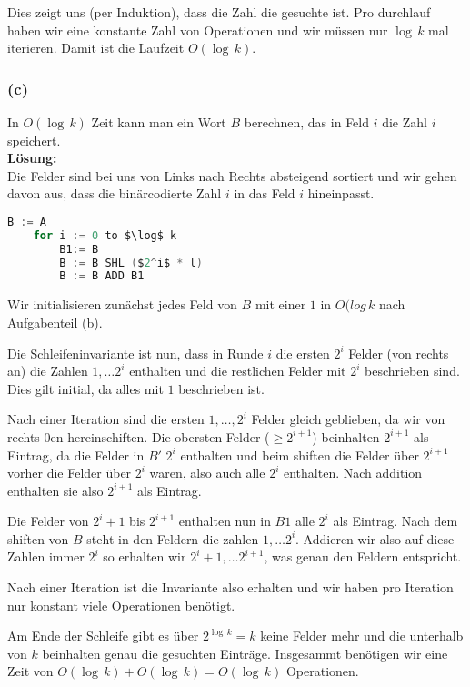 \documentclass[11pt,a4paper,ngerman]{article}
\begin{document}
Dies zeigt uns (per Induktion), dass die Zahl die gesuchte ist. Pro durchlauf haben wir eine konstante Zahl von Operationen und
wir müssen nur $\log \, k$ mal iterieren. Damit ist die Laufzeit $O(\log \, k)$.

\subsubsection*{(c)}
In $O(\log \, k)$ Zeit kann man ein Wort $B$ berechnen, das in Feld $i$ die Zahl $i$ speichert.\\

\noindent\textbf{Lösung:}\\

Die Felder sind bei uns von Links nach Rechts absteigend sortiert und wir gehen davon aus,
dass die binärcodierte Zahl $i$ in das Feld $i$ hineinpasst.

\begin{lstlisting}[frame=single, language=C, morekeywords={:=,SHR,SHL,NOT,XOR,AND,OR,MUL}]
	B := A
	for i := 0 to $\log$ k
		B1:= B
		B := B SHL ($2^i$ * l)
		B := B ADD B1
\end{lstlisting}

Wir initialisieren zunächst jedes Feld von $B$ mit einer $1$ in $O(log \, k$ nach Aufgabenteil (b).

Die Schleifeninvariante ist nun, dass in Runde $i$ die ersten $2^i$ Felder (von rechts an) die Zahlen $1, \ldots 2^i$ enthalten und
die restlichen Felder mit $2^i$ beschrieben sind. Dies gilt initial, da alles mit $1$ beschrieben ist.

Nach einer Iteration sind die ersten $1, \ldots, 2^i$ Felder gleich geblieben, da wir von rechts $0$en hereinschiften. Die obersten Felder ($\geq 2^{i+1}$) beinhalten $2^{i+1}$ als Eintrag, da die Felder in $B'$ $2^i$ enthalten und beim shiften die Felder über $2^{i+1}$ vorher die Felder
über $2^i$ waren, also auch alle $2^i$ enthalten. Nach addition enthalten sie also $2^{i+1}$ als Eintrag.

Die Felder von $2^i+1$ bis $2^{i+1}$ enthalten nun in $B1$ alle $2^i$ als Eintrag. Nach dem shiften von $B$ steht in den Feldern die zahlen
$1, \ldots 2^i$. Addieren wir also auf diese Zahlen immer $2^i$ so erhalten wir $2^i+1,\ldots 2^{i+1}$, was genau den Feldern entspricht.

Nach einer Iteration ist die Invariante also erhalten und wir haben pro Iteration nur konstant viele Operationen benötigt.

Am Ende der Schleife gibt es über $2^{\log \, k} = k$ keine Felder mehr und die unterhalb von $k$ beinhalten genau die gesuchten Einträge.
Insgesammt benötigen wir eine Zeit von $O(\log \, k) + O(\log \, k) = O(\log \, k)$ Operationen.
\end{document}
